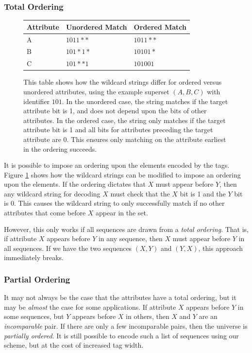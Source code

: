 \subsubsection{Total Ordering}
\begin{figure}
    \begin{tabular}{| l | l | l |}
    \hline
    Attribute & Unordered Match & Ordered Match\\ \hline
    A & $1011**$ & $1011**$ \\ \hline
    B & $101*1*$ & $10101*$ \\ \hline
    C & $101**1$ & $101001$ \\
    \hline
    \end{tabular}
    \caption{This table shows how the wildcard strings differ for ordered versus unordered attributes, using the example superset $(A,B,C)$ with identifier $101$. In the unordered case, the string matches if the target attribute bit is 1, and does not depend upon the bits of other attributes. In the ordered case, the string only matches if the target attribute bit is 1 and all bits for attributes preceding the target attribute are 0. This ensures only matching on the attribute earliest in the ordering succeeds.} 
    \label{tab:ordering}
\end{figure}
It is possible to impose an ordering upon the elements encoded by the tags. Figure \ref{tab:ordering} shows how the wildcard strings can be modified to impose an ordering upon the elements. If the ordering dictates that $X$ must appear before $Y$, then any wildcard string for decoding $X$ must check that the $X$ bit is 1 and the $Y$ bit is 0. This causes the wildcard string to only successfully match if no other attributes that come before $X$ appear in the set.

However, this only works if all sequences are drawn from a \textit{total ordering}. That is, if attribute $X$ appears before $Y$ in any sequence, then $X$ must appear before $Y$ in all sequences. If we have the two sequences $(X, Y)$ and $(Y, X)$, this approach immediately breaks.

\subsubsection{Partial Ordering}
It may not always be the case that the attributes have a total ordering, but it may be \textit{almost} the case for some applications. If attribute $X$ appears before $Y$ in some sequences, but $Y$ appears before $X$ in others, then $X$ and $Y$ are an \textit{incomparable} pair. If there are only a few incomparable pairs, then the universe is \textit{partially ordered}. It is still possible to encode such a list of sequences using our scheme, but at the cost of increased tag width.

